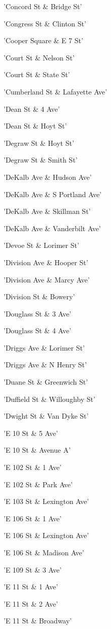 \documentclass[11pt]{article}
\begin{document}
\begin{enumerate*}
\item 'Concord St \& Bridge St'
\item 'Congress St \& Clinton St'
\item 'Cooper Square \& E 7 St'
\item 'Court St \& Nelson St'
\item 'Court St \& State St'
\item 'Cumberland St \& Lafayette Ave'
\item 'Dean St \& 4 Ave'
\item 'Dean St \& Hoyt St'
\item 'Degraw St \& Hoyt St'
\item 'Degraw St \& Smith St'
\item 'DeKalb Ave \& Hudson Ave'
\item 'DeKalb Ave \& S Portland Ave'
\item 'DeKalb Ave \& Skillman St'
\item 'DeKalb Ave \& Vanderbilt Ave'
\item 'Devoe St \& Lorimer St'
\item 'Division Ave \& Hooper St'
\item 'Division Ave \& Marcy Ave'
\item 'Division St \& Bowery'
\item 'Douglass St \& 3 Ave'
\item 'Douglass St \& 4 Ave'
\item 'Driggs Ave \& Lorimer St'
\item 'Driggs Ave \& N Henry St'
\item 'Duane St \& Greenwich St'
\item 'Duffield St \& Willoughby St'
\item 'Dwight St \& Van Dyke St'
\item 'E 10 St \& 5 Ave'
\item 'E 10 St \& Avenue A'
\item 'E 102 St \& 1 Ave'
\item 'E 102 St \& Park Ave'
\item 'E 103 St \& Lexington Ave'
\item 'E 106 St \& 1 Ave'
\item 'E 106 St \& Lexington Ave'
\item 'E 106 St \& Madison Ave'
\item 'E 109 St \& 3 Ave'
\item 'E 11 St \& 1 Ave'
\item 'E 11 St \& 2 Ave'
\item 'E 11 St \& Broadway'

\end{enumerate*}
\end{document}
